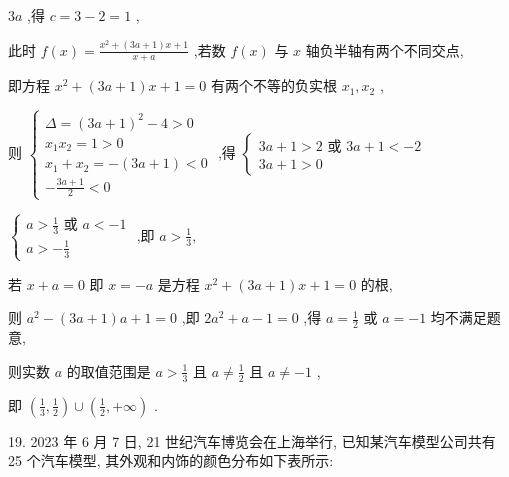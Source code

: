 \documentclass[10pt]{article}
\begin{document}
\({3a}\) ,得 \(c = 3 - 2 = 1\) ,

此时 \(f\left( x\right)  = \frac{{x}^{2} + \left( {{3a} + 1}\right) x + 1}{x + a}\) ,若数 \(f\left( x\right)\) 与 \(x\) 轴负半轴有两个不同交点,

即方程 \({x}^{2} + \left( {{3a} + 1}\right) x + 1 = 0\) 有两个不等的负实根 \({x}_{1},{x}_{2}\) ,

则 \(\left\{  \begin{array}{l} \Delta  = {\left( 3a + 1\right) }^{2} - 4 > 0 \\  {x}_{1}{x}_{2} = 1 > 0 \\  {x}_{1} + {x}_{2} =  - \left( {{3a} + 1}\right)  < 0 \\   - \frac{{3a} + 1}{2} < 0 \end{array}\right.\) ,得 \(\left\{  \begin{matrix} {3a} + 1 > 2\text{ 或 }{3a} + 1 <  - 2 \\  {3a} + 1 > 0 \end{matrix}\right.\)

\(\left\{  \begin{matrix} a > \frac{1}{3}\text{ 或 }a <  - 1 \\  a >  - \frac{1}{3} \end{matrix}\right.\) ,即 \(a > \frac{1}{3},\)

若 \(x + a = 0\) 即 \(x =  - a\) 是方程 \({x}^{2} + \left( {{3a} + 1}\right) x + 1 = 0\) 的根,

则 \({a}^{2} - \left( {{3a} + 1}\right) a + 1 = 0\) ,即 \(2{a}^{2} + a - 1 = 0\) ,得 \(a = \frac{1}{2}\) 或 \(a =  - 1\) 均不满足题意,

则实数 \(a\) 的取值范围是 \(a > \frac{1}{3}\) 且 \(a \neq  \frac{1}{2}\) 且 \(a \neq   - 1\) ,

即 \(\left( {\frac{1}{3},\frac{1}{2}}\right)  \cup  \left( {\frac{1}{2}, + \infty }\right)\) .

19. 2023 年 6 月 7 日, 21 世纪汽车博览会在上海举行, 已知某汽车模型公司共有 25 个汽车模型, 其外观和内饰的颜色分布如下表所示:

\begin{center}
\end{center}
\end{document}
